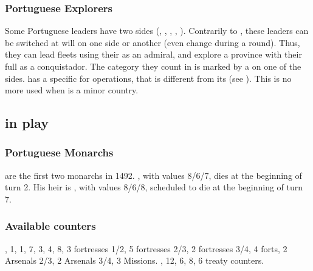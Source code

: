 \subsubsection{Portuguese Explorers}
\aparag Some Portuguese leaders have two sides (,
, , ,
).
\bparag\label{chSpecific:Portugal:Explorers} Contrarily to
, these leaders can be switched
at will on one side or another (even change during a round). Thus, they
can lead fleets using their \Man as an admiral, and explore a province
with their full \Man as a conquistador.
\bparag The category they count in is marked by a {\textetoile} on one
of the sides.
 \POR has a specific \FTI for \ROTW
operations, that is different from its \FTI (see ).
\bparag This \FTI is no more used when \POR is a minor country.


\subsection{ in play}
\subsubsection{Portuguese Monarchs}
 are the
first two monarchs in 1492. , with values 8/6/7, dies
at the beginning of turn 2. His heir is , with values
8/6/8, scheduled to die at the beginning of turn 7.
\subsubsection{Available counters}
\ARMY, 1\FLEET, 1\corsaire, 7\LDND, 3\LD, 4\NTD,
8\LDENDE, 3 fortresses 1/2, 5 fortresses 2/3, 2 fortresses 3/4, 4 forts,
2 Arsenals 2/3, 2 Arsenals 3/4, 3 Missions.
\COL, 12\TP, 6\MNU, 8\TradeFLEET, 6 \ROTW treaty
counters.

